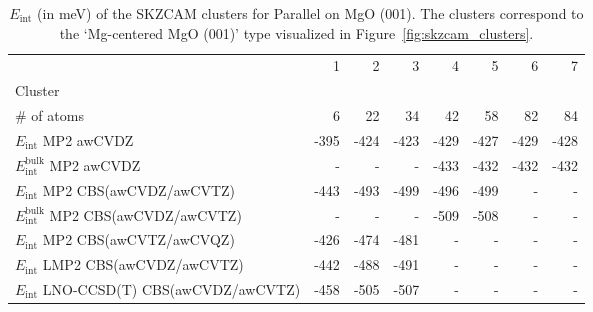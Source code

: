 \begin{table}
\caption{\label{tab:system_eint_mgo_ch3oh_parallel}$E_\textrm{int}$ (in meV) of the SKZCAM clusters for Parallel  on MgO (001). The clusters correspond to the `Mg-centered MgO (001)' type visualized in Figure~\ref{fig:skzcam_clusters}.}
\begin{adjustbox}{center,max width=1.4\textwidth}
\begin{tabular}{lrrrrrrr}
\toprule
 & 1 & 2 & 3 & 4 & 5 & 6 & 7 \\ 
Cluster &  &  &  &  &  &  &  \\
\midrule
\# of atoms & 6 & 22 & 34 & 42 & 58 & 82 & 84 \\
$E_\textrm{int}$ MP2 awCVDZ & -395 & -424 & -423 & -429 & -427 & -429 & -428 \\
$E_\textrm{int}^\textrm{bulk}$ MP2 awCVDZ & - & - & - & -433 & -432 & -432 & -432 \\
$E_\textrm{int}$ MP2 CBS(awCVDZ/awCVTZ) & -443 & -493 & -499 & -496 & -499 & - & - \\
$E_\textrm{int}^\textrm{bulk}$ MP2 CBS(awCVDZ/awCVTZ) & - & - & - & -509 & -508 & - & - \\
$E_\textrm{int}$ MP2 CBS(awCVTZ/awCVQZ) & -426 & -474 & -481 & - & - & - & - \\
$E_\textrm{int}$ LMP2 CBS(awCVDZ/awCVTZ) & -442 & -488 & -491 & - & - & - & - \\
$E_\textrm{int}$ LNO-CCSD(T) CBS(awCVDZ/awCVTZ) & -458 & -505 & -507 & - & - & - & - \\
\bottomrule
\end{tabular}
\end{adjustbox}
\end{table}

